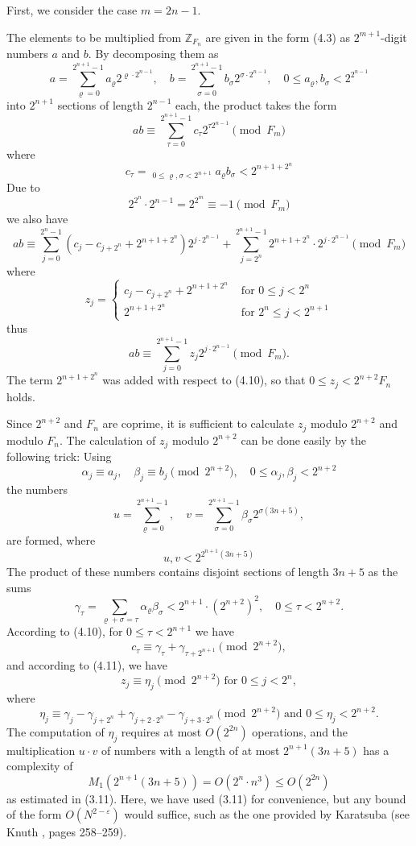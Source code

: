 \documentclass{article}
\begin{document}
First, we consider the case $m = 2n - 1$.

The elements to be multiplied from $\mathbb{Z}_{F_n}$ are given in the form (4.3) as $2^{m + 1}$-digit numbers $a$ and $b$. By decomposing them as
\[
\tag{4.9}
a = \sum_{\varrho = 0}^{2^{n + 1} - 1} a_\varrho 2^{\varrho \cdot 2^{n - 1}}, \quad b = \sum_{\sigma = 0}^{2^{n + 1} - 1} b_\sigma 2^{\sigma \cdot 2^{n - 1}}, \quad 0 \le a_\varrho, b_\sigma < 2^{2^{n - 1}}
\]
into $2^{n + 1}$ sections of length $2^{n - 1}$ each, the product takes the form
\[
ab \equiv \sum_{\tau = 0}^{2^{n + 1} - 1} c_\tau 2^{\tau 2^{n - 1}} \pmod{F_m}
\]
where
\[
\tag{4.10}
c_\tau = \mathop{\sum_{\varrho + \sigma \equiv \tau \pmod{2^{n + 1}}}}_{0 \le \varrho, \sigma < 2^{n + 1}} a_\varrho b_\sigma < 2^{n + 1 + 2^n}
\]
Due to
\[
2^{2^n} \cdot 2^{n - 1} = 2^{2^m} \equiv -1 \pmod{F_m}
\]
we also have
\[
ab \equiv \sum_{j = 0}^{2^n - 1} \left(c_j - c_{j + 2^n} + 2^{n + 1 + 2^n}\right) 2^{j \cdot 2^{n - 1}} + \sum_{j = 2^n}^{2^{n + 1} - 1} 2^{n + 1 + 2^n} \cdot 2^{j \cdot 2^{n - 1}} \pmod{F_m}
\]
where
\[
\tag{4.11}
z_j =
\begin{cases}
c_j - c_{j + 2^n} + 2^{n + 1 + 2^n} & \text{ for } 0 \le j < 2^n \\
2^{n + 1 + 2^n} & \text{ for } 2^n \le j < 2^{n + 1}
\end{cases}
\]
thus
\[
\tag{4.12}
ab \equiv \sum_{j = 0}^{2^{n + 1} - 1} z_j 2^{j \cdot 2^{n - 1}} \pmod{F_m}.
\]
The term $2^{n + 1 + 2^n}$ was added with respect to (4.10), so that $0 \le z_j < 2^{n + 2} F_n$ holds.

Since $2^{n + 2}$ and $F_n$ are coprime, it is sufficient to calculate $z_j$ modulo $2^{n + 2}$ and modulo $F_n$. The calculation of $z_j$ modulo $2^{n + 2}$ can be done easily by the following trick: Using
\[
\alpha_j \equiv a_j, \quad \beta_j \equiv b_j \pmod{2^{n + 2}}, \quad 0 \le \alpha_j, \beta_j < 2^{n + 2}
\]
the numbers
\[
u = \sum_{\varrho = 0}^{2^{n + 1} - 1}, \quad v = \sum_{\sigma = 0}^{2^{n + 1} - 1} \beta_\sigma 2^{\sigma (3n + 5)},
\]
are formed, where
\[
u, v < 2^{2^{n + 1}(3n + 5)}
\]
The product of these numbers contains disjoint sections of length $3n + 5$ as the sums
\[
\gamma_\tau = \sum_{\varrho + \sigma = \tau} \alpha_\varrho \beta_\sigma < 2^{n + 1} \cdot \left(2^{n + 2}\right)^2, \quad 0 \le \tau < 2^{n + 2}.
\]
According to (4.10), for $0 \le \tau < 2^{n + 1}$ we have
\[
c_\tau \equiv \gamma_\tau + \gamma_{\tau + 2^{n + 1}} \pmod{2^{n + 2}},
\]
and according to (4.11), we have
\[
\tag{4.14}
z_j \equiv \eta_j \pmod{2^{n + 2}}\text{ for }0 \le j < 2^n,
\]
where
\[
\eta_j \equiv \gamma_j - \gamma_{j + 2^n} + \gamma_{j + 2 \cdot 2^n} - \gamma_{j + 3 \cdot 2^n} \pmod{2^{n + 2}}\text{ and }0 \le \eta_j < 2^{n + 2}.
\]
The computation of $\eta_j$ requires at most $O(2^{2n})$ operations, and the multiplication $u \cdot v$ of numbers with a length of at most $2^{n + 1} (3n + 5)$ has a complexity of
\[
M_1(2^{n + 1} (3n + 5)) = O(2^n \cdot n^3) \le O(2^{2n})
\]
as estimated in (3.11). Here, we have used (3.11) for convenience, but any bound of the form $O(N^{2 - \varepsilon})$ would suffice, such as the one provided by Karatsuba (see Knuth \cite{knuth}, pages 258--259).
\end{document}
